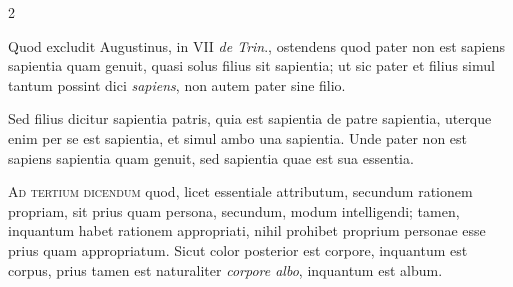 \documentclass[paper=a4paper,fontsize=10pt,jafontsize=9pt,titlepage]{jlreq}
\begin{document}
\begin{paracol}{2}
\switchcolumn


\switchcolumn*

Quod excludit Augustinus, in VII \textit{de Trin}.,
ostendens quod pater non est sapiens sapientia quam genuit, quasi solus filius
sit sapientia; ut sic pater et filius simul tantum possint dici \textit{sapiens}, non
autem pater sine filio.

\switchcolumn


\switchcolumn*

Sed filius dicitur sapientia patris, quia est sapientia
de patre sapientia, uterque enim per se est sapientia, et simul ambo una
sapientia. Unde pater non est sapiens sapientia quam genuit, sed sapientia quae
est sua essentia.

\switchcolumn


\switchcolumn*

\textsc{Ad tertium dicendum} quod, licet essentiale attributum, secundum rationem
propriam, sit prius quam persona, secundum, modum intelligendi; tamen,
inquantum habet rationem appropriati, nihil prohibet proprium personae esse
prius quam appropriatum. Sicut color posterior est corpore, inquantum est
corpus, prius tamen est naturaliter \textit{corpore albo}, inquantum est album.

\switchcolumn


\switchcolumn*

\end{paracol}
\newpage
\end{document}
